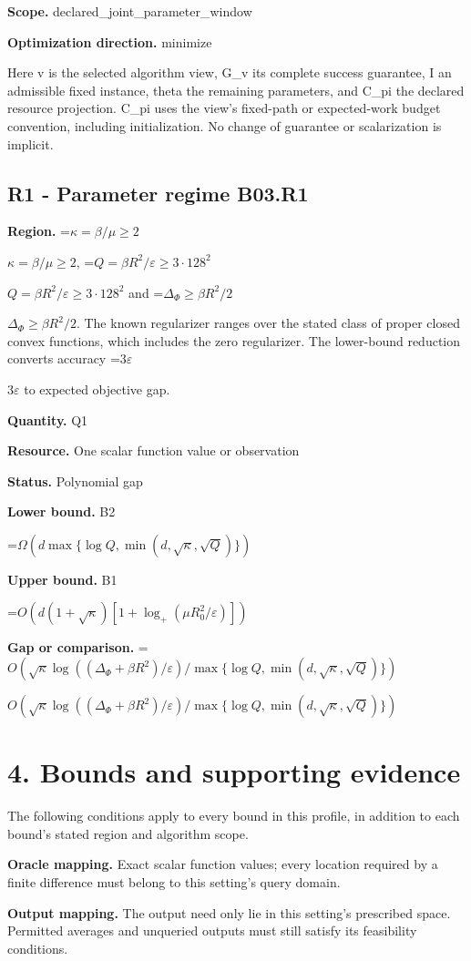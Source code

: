 \documentclass[10pt,a4paper]{article}
\newcommand{\AtlasMath}[1]{\par\begingroup\centering\setbox0=\hbox{$\displaystyle #1$}\ifdim\wd0>1.4\linewidth\typeout{ATLAS WIDE FORMULA: \the\wd0}\fi\ifdim\wd0>\linewidth\resizebox{\linewidth}{!}{\box0}\else\box0\fi\par\endgroup}
\newcommand{\AtlasInlineMath}[1]{\begingroup\setbox0=\hbox{$#1$}\ifdim\wd0>.4\linewidth\endgroup\AtlasMath{#1}\else\endgroup$#1$\fi}
\begin{document}
\textbf{Scope.} declared\_joint\_parameter\_window

\textbf{Optimization direction.} minimize

Here v is the selected algorithm view, G\_v its complete success guarantee, I an admissible fixed instance, theta the remaining parameters, and C\_pi the declared resource projection. C\_pi uses the view's fixed-path or expected-work budget convention, including initialization. No change of guarantee or scalarization is implicit.

\subsection{R1 - Parameter regime B03.R1}
\textbf{Region.} \AtlasInlineMath{\kappa=\beta/\mu\ge2}, \AtlasInlineMath{Q=\beta R^2/\varepsilon\ge3\cdot128^2} and \AtlasInlineMath{\Delta_\Phi\ge\beta R^2/2}. The known regularizer ranges over the stated class of proper closed convex functions, which includes the zero regularizer. The lower-bound reduction converts accuracy \AtlasInlineMath{3\varepsilon} to expected objective gap.

\textbf{Quantity.} Q1

\textbf{Resource.} One scalar function value or observation

\textbf{Status.} Polynomial gap

\textbf{Lower bound.} B2

\AtlasMath{\Omega(d\max\{\log Q,\min(d,\sqrt\kappa,\sqrt Q)\})}
\textbf{Upper bound.} B1

\AtlasMath{O(d(1+\sqrt\kappa)[1+\log_+(\mu R_0^2/\varepsilon)])}
\textbf{Gap or comparison.} \AtlasInlineMath{O(\sqrt\kappa\log((\Delta_\Phi+\beta R^2)/\varepsilon)/\max\{\log Q,\min(d,\sqrt\kappa,\sqrt Q)\})}

\section{4. Bounds and supporting evidence}
The following conditions apply to every bound in this profile, in addition to each bound's stated region and algorithm scope.

\textbf{Oracle mapping.} Exact scalar function values; every location required by a finite difference must belong to this setting's query domain.

\textbf{Output mapping.} The output need only lie in this setting's prescribed space. Permitted averages and unqueried outputs must still satisfy its feasibility conditions.
\end{document}
